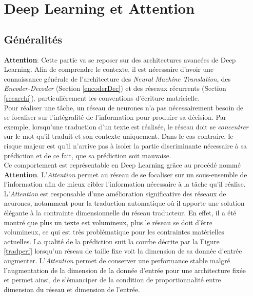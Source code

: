 \section{Deep Learning et Attention}
\subsection{Généralités}
\noindent \textbf{Attention}: Cette partie va se reposer sur des architectures avancées de Deep Learning. Afin de comprendre le contexte, il est nécessaire d'avoir une connaissance générale de l'architecture des \textit{Neural Machine Translation}, des \textit{Encoder-Decoder} (Section \ref{encoderDec}) et des réseaux récurrents (Section \ref{recarchi}), particulièrement les conventions d'écriture matricielle.\\

\noindent Pour réaliser une tâche, un réseau de neurones n'a pas nécessairement besoin de se focaliser sur l'intégralité de l'information pour produire sa décision. Par exemple, lorsqu'une traduction d'un texte est réalisée, le réseau doit se \textit{concentrer} sur le mot qu'il traduit et son contexte uniquement. Dans le cas contraire, le risque majeur est qu'il n'arrive pas à isoler la partie discriminante nécessaire à sa prédiction et de ce fait, que sa prédiction soit mauvaise.\\

\noindent Ce comportement est représentable en Deep Learning grâce au procédé nommé \textbf{Attention}. L'\textit{Attention} permet au réseau de se focaliser sur un sous-ensemble de l'information afin de mieux cibler l'information nécessaire à la tâche qu'il réalise. L'\textit{Attention} est responsable d'une amélioration significative des réseaux de neurones, notamment pour la traduction automatique où il apporte une solution élégante à la contrainte dimensionnelle du réseau traducteur. En effet, il a été montré que plus un texte est volumineux, plus le réseau se doit d'être volumineux\cite{malectrad}\cite{malectrad2}, ce qui est très problématique pour les contraintes matérielles actuelles. La qualité de la prédiction suit la courbe décrite par la Figure \ref{tradperf} lorsqu'un réseau de taille fixe voit la dimension de sa donnée d'entrée augmenter. L'\textit{Attention} permet de conserver une performance stable malgré l'augmentation de la dimension de la donnée d'entrée pour une architecture fixée et permet ainsi, de s'émanciper de la condition de proportionnalité entre dimension du réseau et dimension de l'entrée.\\

